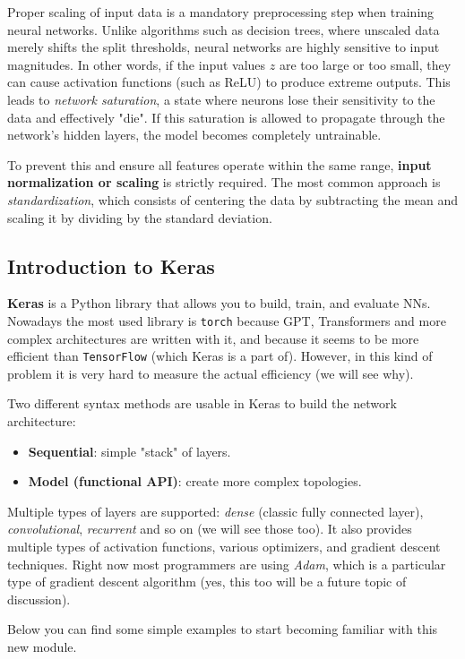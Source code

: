 Proper scaling of input data is a mandatory preprocessing step when training neural networks. Unlike algorithms such as decision trees, where unscaled data merely shifts the split thresholds, neural networks are highly sensitive to input magnitudes. In other words, if the input values $z$ are too large or too small, they can cause activation functions (such as ReLU) to produce extreme outputs. This leads to \textit{network saturation}, a state where neurons lose their sensitivity to the data and effectively "die". If this saturation is allowed to propagate through the network's hidden layers, the model becomes completely untrainable. 

To prevent this and ensure all features operate within the same range, \textbf{input normalization or scaling} is strictly required. The most common approach is \textit{standardization}, which consists of centering the data by subtracting the mean and scaling it by dividing by the standard deviation.

\subsection{Introduction to Keras}
\textbf{Keras} is a Python library that allows you to build, train, and evaluate NNs. Nowadays the most used library is \texttt{torch} because GPT, Transformers and more complex architectures are written with it, and because it seems to be more efficient than \texttt{TensorFlow} (which Keras is a part of). However, in this kind of problem it is very hard to measure the actual efficiency (we will see why). 

Two different syntax methods are usable in Keras to build the network architecture:
\begin{itemize}
    \item[-] \textbf{Sequential}: simple "stack" of layers.
    \item[-] \textbf{Model (functional API)}: create more complex topologies.
\end{itemize}
Multiple types of layers are supported: \textit{dense} (classic fully connected layer), \textit{convolutional}, \textit{recurrent} and so on (we will see those too). It also provides multiple types of activation functions, various optimizers, and gradient descent techniques. Right now most programmers are using \textit{Adam}, which is a particular type of gradient descent algorithm (yes, this too will be a future topic of discussion). 

Below you can find some simple examples to start becoming familiar with this new module.

